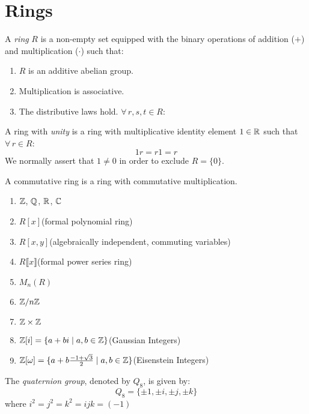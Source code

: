 \documentclass[letterpaper,12pt,fleqn]{article}
\newcommand{\hs}{\hspace{2ex}}
\newcommand{\w}{\omega}
\begin{document}
\section*{Rings}

\begin{definition}[Ring]
  A \emph{ring} $R$ is a non-empty set equipped with the binary operations of
  addition ($+$) and multiplication ($\cdot$) such that:
  \begin{enumerate}
  \item $R$ is an additive abelian group.
  \item Multiplication is associative.
  \item The distributive laws hold. $\forall\,r,s,t\in R$:
  \end{enumerate}

  A ring with \emph{unity} is a ring with multiplicative identity element
  $1\in\mathbb{R}$ such that $\forall\,r\in R$:
  \[1r=r1=r\]
  We normally assert that $1\ne0$ in order to exclude $R=\{0\}$.

  A commutative ring is a ring with commutative multiplication.
\end{definition}

\begin{example}
  \listbreak
  \begin{enumerate}
  \item $\mathbb{Z}$, $\mathbb{Q}$, $\mathbb{R}$, $\mathbb{C}$
  \item $R[x]$\hs(formal polynomial ring)
  \item $R[x,y]$\hs(algebraically independent, commuting variables)
  \item $R\llbracket x\rrbracket$\hs(formal power series ring)
  \item $M_n(R)$
  \item $\mathbb{Z}/n\mathbb{Z}$
  \item $\mathbb{Z}\times\mathbb{Z}$
  \item $\mathbb{Z}[i]=\{a+bi\mid a,b\in\mathbb{Z}\}$\hs(Gaussian Integers)
  \item $\Z[\w]=\{a+b\frac{-1+\sqrt{3}}{2}\mid a,b\in\Z\}$\hs(Eisenstein Integers)
  \end{enumerate}
\end{example}

\begin{definition}
  The \emph{quaternion group}, denoted by $Q_8$, is given by:
  \[Q_8=\{\pm1,\pm i,\pm j,\pm k\}\]
  where $i^2=j^2=k^2=ijk=(-1)$
\end{definition}
\end{document}
